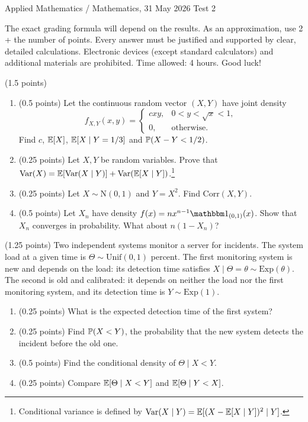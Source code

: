 \documentclass[a4paper]{report}
\begin{document}
\noindent Applied Mathematics / Mathematics, 31 May 2026 \hfill Test 2
\hrulefill
\begin{it}
The exact grading formula will depend on the results. As an approximation, use 2 + the number of points. Every answer must be justified and supported by clear, detailed calculations. Electronic devices (except standard calculators) and additional materials are prohibited. Time allowed: 4 hours. Good luck!
\end{it}
\begin{problem} (1.5 points)~
\begin{enumerate}
\item (0.5 points) Let the continuous random vector $(X,Y)$ have joint density
\[f_{X,Y}(x,y)=\begin{cases}cxy,&0<y<\sqrt x<1,\\0,&\text{otherwise.}\end{cases}\]
Find $c$, $\E[X]$, $\E[X\mid Y=1/3]$ and $\P(X-Y<1/2)$.
\item (0.25 points) Let $X,Y$ be random variables. Prove that
$\mathrm{Var}(X)=\E[\mathrm{Var}(X\mid Y)]+\mathrm{Var}(\E[X\mid Y])$.\footnote{Conditional variance is defined by $\mathrm{Var}(X\mid Y)=\E[(X-\E[X\mid Y])^2\mid Y]$.}
\item (0.25 points) Let $X\sim\mathrm N(0,1)$ and $Y=X^2$. Find $\mathrm{Corr}(X,Y)$.
\item (0.5 points) Let $X_n$ have density $f(x)=nx^{n-1}\mathbbm1_{(0,1)}(x)$. Show that $X_n$ converges in probability. What about $n(1-X_n)$?
\end{enumerate}
\end{problem}
\begin{problem} (1.25 points)
Two independent systems monitor a server for incidents. The system load at a given time is $\Theta\sim\mathrm{Unif}(0,1)$ percent. The first monitoring system is new and depends on the load: its detection time satisfies $X\mid\Theta=\theta\sim\mathrm{Exp}(\theta)$. The second is old and calibrated: it depends on neither the load nor the first monitoring system, and its detection time is $Y\sim\mathrm{Exp}(1)$.
\begin{enumerate}
\item (0.25 points) What is the expected detection time of the first system?
\item (0.25 points) Find $\P(X<Y)$, the probability that the new system detects the incident before the old one.
\item (0.5 points) Find the conditional density of $\Theta\mid X<Y$.
\item (0.25 points) Compare $\E[\Theta\mid X<Y]$ and $\E[\Theta\mid Y<X]$.
\end{enumerate}
\end{problem}
\end{document}
